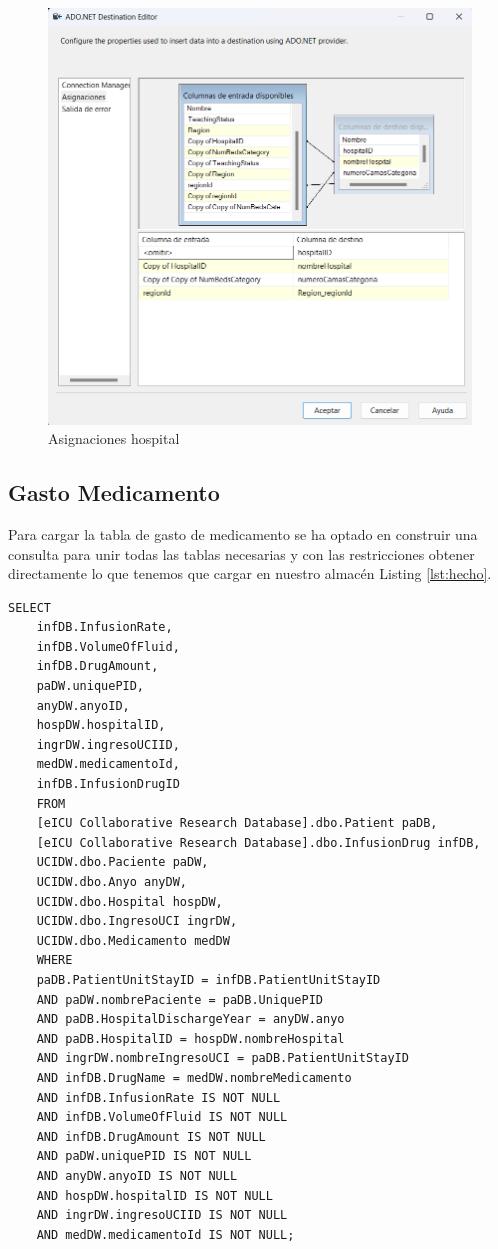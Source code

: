\documentclass{article}
\begin{document}
		\begin{figure}[H]
		\centering
		\includegraphics[width=.7\linewidth]{./images/asignaciones/hospital.png}
		\caption{Asignaciones hospital}
	\end{figure}
	
	\subsection{Gasto Medicamento}
	
	
	Para cargar la tabla de gasto de medicamento se ha optado en construir una consulta para unir todas las tablas necesarias y con las restricciones obtener directamente lo que tenemos que cargar en nuestro almacén Listing \ref{lst:hecho}.
	\begin{lstlisting}[style=ddlstyle, label=lst:hecho,caption=Consulta para llenado de hecho]
	SELECT 
	infDB.InfusionRate, 
	infDB.VolumeOfFluid, 
	infDB.DrugAmount, 
	paDW.uniquePID, 
	anyDW.anyoID, 
	hospDW.hospitalID, 
	ingrDW.ingresoUCIID, 
	medDW.medicamentoId,
	infDB.InfusionDrugID 
	FROM 
	[eICU Collaborative Research Database].dbo.Patient paDB,
	[eICU Collaborative Research Database].dbo.InfusionDrug infDB,
	UCIDW.dbo.Paciente paDW,
	UCIDW.dbo.Anyo anyDW,
	UCIDW.dbo.Hospital hospDW,
	UCIDW.dbo.IngresoUCI ingrDW,
	UCIDW.dbo.Medicamento medDW
	WHERE 
	paDB.PatientUnitStayID = infDB.PatientUnitStayID 
	AND paDW.nombrePaciente = paDB.UniquePID 
	AND paDB.HospitalDischargeYear = anyDW.anyo 
	AND paDB.HospitalID = hospDW.nombreHospital 
	AND ingrDW.nombreIngresoUCI = paDB.PatientUnitStayID 
	AND infDB.DrugName = medDW.nombreMedicamento 
	AND infDB.InfusionRate IS NOT NULL
	AND infDB.VolumeOfFluid IS NOT NULL
	AND infDB.DrugAmount IS NOT NULL
	AND paDW.uniquePID IS NOT NULL
	AND anyDW.anyoID IS NOT NULL
	AND hospDW.hospitalID IS NOT NULL
	AND ingrDW.ingresoUCIID IS NOT NULL
	AND medDW.medicamentoId IS NOT NULL;
	\end{lstlisting}
	
\end{document}
